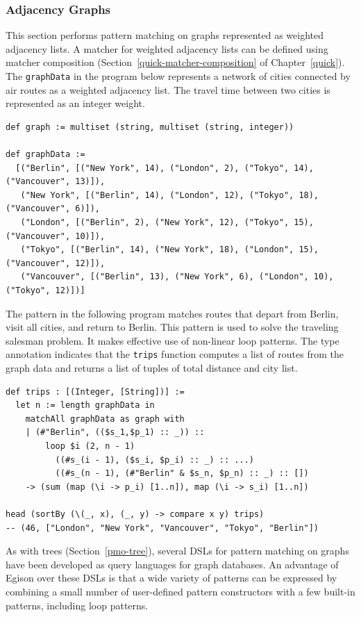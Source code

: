 \subsubsection{Adjacency Graphs}

This section performs pattern matching on graphs represented as weighted adjacency lists.
A matcher for weighted adjacency lists can be defined using matcher composition (Section~\ref{quick-matcher-composition} of Chapter~\ref{quick}).
The \lstinline{graphData} in the program below represents a network of cities connected by air routes as a weighted adjacency list.
The travel time between two cities is represented as an integer weight.
\begin{lstlisting}[language=egison,numbers=none]
def graph := multiset (string, multiset (string, integer))

def graphData :=
  [("Berlin", [("New York", 14), ("London", 2), ("Tokyo", 14), ("Vancouver", 13)]),
   ("New York", [("Berlin", 14), ("London", 12), ("Tokyo", 18), ("Vancouver", 6)]),
   ("London", [("Berlin", 2), ("New York", 12), ("Tokyo", 15), ("Vancouver", 10)]),
   ("Tokyo", [("Berlin", 14), ("New York", 18), ("London", 15), ("Vancouver", 12)]),
   ("Vancouver", [("Berlin", 13), ("New York", 6), ("London", 10), ("Tokyo", 12)])]
\end{lstlisting}
The pattern in the following program matches routes that depart from Berlin, visit all cities, and return to Berlin.
This pattern is used to solve the traveling salesman problem.
It makes effective use of non-linear loop patterns.
The type annotation indicates that the \lstinline{trips} function computes a list of routes from the graph data and returns a list of tuples of total distance and city list.
\begin{lstlisting}[language=egison,numbers=none]
def trips : [(Integer, [String])] :=
  let n := length graphData in
    matchAll graphData as graph with
    | (#"Berlin", (($s_1,$p_1) :: _)) ::
        loop $i (2, n - 1)
          ((#s_(i - 1), ($s_i, $p_i) :: _) :: ...)
          ((#s_(n - 1), (#"Berlin" & $s_n, $p_n) :: _) :: [])
    -> (sum (map (\i -> p_i) [1..n]), map (\i -> s_i) [1..n])

head (sortBy (\(_, x), (_, y) -> compare x y) trips)
-- (46, ["London", "New York", "Vancouver", "Tokyo", "Berlin"])
\end{lstlisting}

As with trees (Section~\ref{pmo-tree}), several DSLs for pattern matching on graphs have been developed as query languages for graph databases.
An advantage of Egison over these DSLs is that a wide variety of patterns can be expressed by combining a small number of user-defined pattern constructors with a few built-in patterns, including loop patterns.
